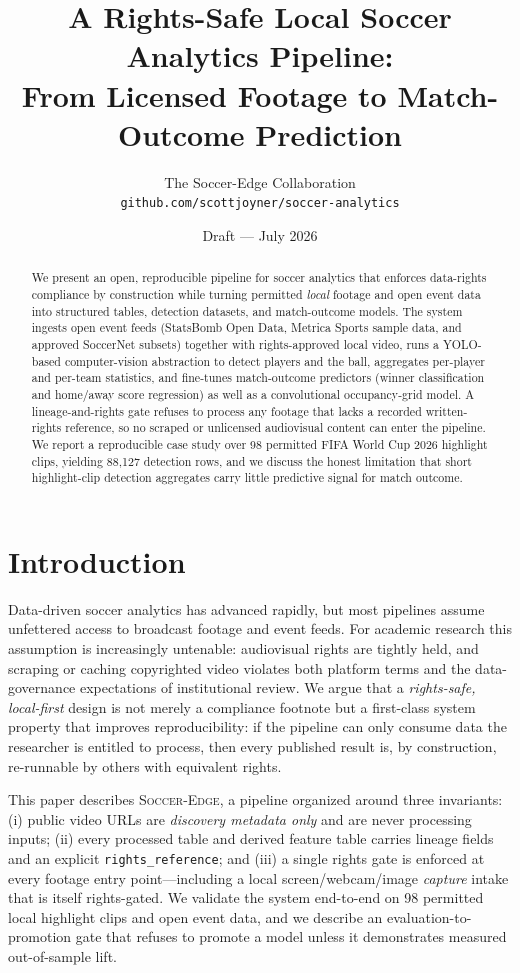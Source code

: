 \documentclass[11pt]{article}
\title{A Rights-Safe Local Soccer Analytics Pipeline:\\From Licensed Footage to Match-Outcome Prediction}
\author{
  The Soccer-Edge Collaboration\\
  \texttt{github.com/scottjoyner/soccer-analytics}
}
\date{Draft --- July 2026}
\begin{document}
\maketitle

\begin{abstract}
We present an open, reproducible pipeline for soccer analytics that enforces
data-rights compliance by construction while turning permitted \emph{local}
footage and open event data into structured tables, detection datasets, and
match-outcome models. The system ingests open event feeds (StatsBomb Open Data,
Metrica Sports sample data, and approved SoccerNet subsets) together with
rights-approved local video, runs a YOLO-based computer-vision abstraction to
detect players and the ball, aggregates per-player and per-team statistics, and
fine-tunes match-outcome predictors (winner classification and home/away score
regression) as well as a convolutional occupancy-grid model. A lineage-and-rights
gate refuses to process any footage that lacks a recorded written-rights
reference, so no scraped or unlicensed audiovisual content can enter the
pipeline. We report a reproducible case study over 98 permitted FIFA World Cup
2026 highlight clips, yielding 88,127 detection rows, and we discuss the
honest limitation that short highlight-clip detection aggregates carry little
predictive signal for match outcome.
\end{abstract}

\section{Introduction}
Data-driven soccer analytics has advanced rapidly, but most pipelines assume
unfettered access to broadcast footage and event feeds. For academic research
this assumption is increasingly untenable: audiovisual rights are tightly held,
and scraping or caching copyrighted video violates both platform terms and the
data-governance expectations of institutional review. We argue that a
\emph{rights-safe, local-first} design is not merely a compliance footnote but a
first-class system property that improves reproducibility: if the pipeline can
only consume data the researcher is entitled to process, then every published
result is, by construction, re-runnable by others with equivalent rights.

This paper describes \textsc{Soccer-Edge}, a pipeline organized around three
invariants: (i) public video URLs are \emph{discovery metadata only} and are
never processing inputs; (ii) every processed table and derived feature table
carries lineage fields and an explicit \texttt{rights\_reference}; and (iii) a
single rights gate is enforced at every footage entry point---including a
local screen/webcam/image \emph{capture} intake that is itself rights-gated. We
validate the system end-to-end on 98 permitted local highlight clips and open
event data, and we describe an evaluation-to-promotion gate that refuses to
promote a model unless it demonstrates measured out-of-sample lift.
\end{document}
